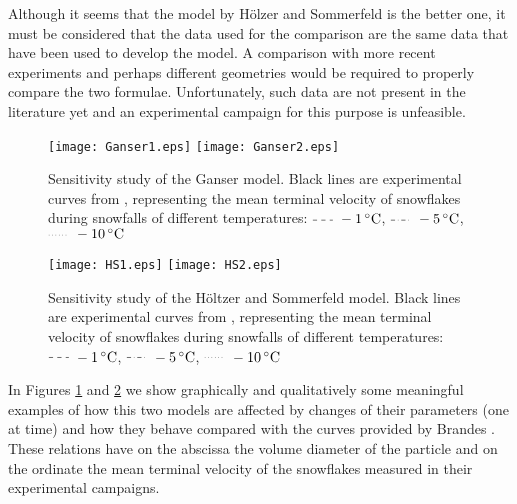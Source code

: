		Although it seems that the model by H\"{o}lzer and Sommerfeld is the better one, it must be considered that the data used for the comparison are the same data that have been used to develop the model. A comparison with more recent experiments and perhaps different geometries would be required to properly compare the two formulae. Unfortunately, such data are not present in the literature yet and an experimental campaign for this purpose is unfeasible. 
		
		\begin{figure}
			\centering
			\texttt{[image: Ganser1.eps]}
			\texttt{[image: Ganser2.eps]}
			\caption[Sensitivity study of the Ganser model.]{Sensitivity study of the Ganser model. Black lines are experimental curves from \cite{BrandesIkedEtAl-2008}, representing the mean terminal velocity of snowflakes during snowfalls of different temperatures: 
				$ \tikz[baseline] {\draw[dashed] (0,.5ex)--(.5,.5ex) ;} ~\SI{-1}{\celsius} $,
				$ \tikz[baseline] {\draw[dash dot] (0,.5ex)--(.5,.5ex) ;} ~\SI{-5}{\celsius} $,
				$ \tikz[baseline] {\draw[dotted] (0,.5ex)--(.5,.5ex) ;} ~\SI{-10}{\celsius} $}
			\label{fig: sensitivityGanser}
		\end{figure}	
		
		\begin{figure}
			\centering
			\texttt{[image: HS1.eps]}
			\texttt{[image: HS2.eps]}
			\caption[Sensitivity study of the H\"oltzer and Sommerfeld model.]{Sensitivity study of the H\"oltzer and Sommerfeld model. Black lines are experimental curves from \cite{BrandesIkedEtAl-2008}, representing the mean terminal velocity of snowflakes during snowfalls of different temperatures: 
				$ \tikz[baseline] {\draw[dashed] (0,.7ex)--(.5,.7ex) ;} ~\SI{-1}{\celsius} $,
				$ \tikz[baseline] {\draw[dash dot] (0,.7ex)--(.5,.7ex) ;} ~\SI{-5}{\celsius} $,
				$ \tikz[baseline] {\draw[dotted] (0,.7ex)--(.5,.7ex) ;} ~\SI{-10}{\celsius} $}
			\label{fig: sensitivityHS}
		\end{figure}	
		
		In Figures \ref{fig: sensitivityGanser} and \ref{fig: sensitivityHS} we show graphically and qualitatively some meaningful examples of how this two models are affected by changes of their parameters (one at time) and how they behave compared with the curves provided by Brandes \cite{BrandesIkedEtAl-2008}. These relations have on the abscissa the volume diameter of the particle and on the ordinate the mean terminal velocity of the snowflakes measured in their experimental campaigns. 
		
